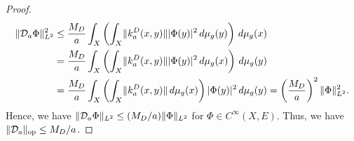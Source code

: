 \documentclass[a4paper,oneside,12pt]{amsart}
\theoremstyle{plain}
\theoremstyle{definition}
\theoremstyle{remark}
\DeclarePairedDelimiter{\abs}{\lvert}{\rvert}
\DeclarePairedDelimiter{\norm}{\lVert}{\rVert}
\newcommand{\dvol}{d\mu}
\newcommand{\Ltwonorm}[2][L^2]{\norm{#2}_{#1}}
\DeclarePairedDelimiter{\operatornorm}{\lVert}{\rVert_{\mathrm{op}}}
\newcommand{\mesoscopicDiracoperator}[1][a]{\mathcal{D}_{#1}}
\newcommand{\integralkernel}{k}
\newcommand{\kernelDirac}{\integralkernel_a^D}
\begin{document}
\begin{proof}
\begin{equation}
    \begin{aligned}
    \Ltwonorm{\mesoscopicDiracoperator \Phi}^2 \le{}& \frac{M_D}{a} \int_X \left( \int_X \norm{\kernelDirac(x,y)} \abs{\Phi(y)}^2 \,\dvol_g(y) \right) \,\dvol_g(x) \\
    ={}& \frac{M_D}{a} \int_X \left( \int_X \norm{\kernelDirac(x,y)} \abs{\Phi(y)}^2 \,\dvol_g(x) \right) \,\dvol_g(y) \\
    ={}& \frac{M_D}{a} \int_X \left( \int_X \norm{\kernelDirac(x,y)} \,\dvol_g(x) \right) \abs{\Phi(y)}^2 \,\dvol_g(y) = \left(\frac{M_D}{a}\right)^2 \Ltwonorm{\Phi}^2.
    \end{aligned}
  \end{equation}
  Hence, we have $\Ltwonorm{\mesoscopicDiracoperator \Phi} \le (M_D/a) \Ltwonorm{\Phi}$ for $\Phi \in C^{\infty}(X,E)$.
  Thus, we have $\operatornorm{\mesoscopicDiracoperator} \le M_D/a$.
\end{proof}
\end{document}
